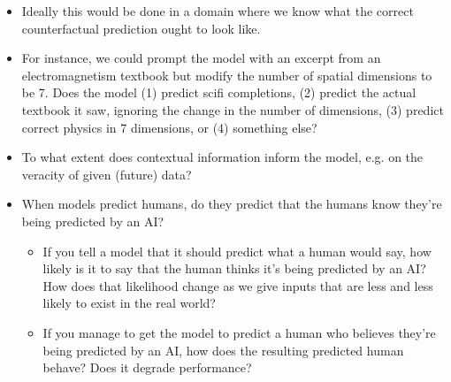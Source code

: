 {{\begin{itemize}
        \begin{itemize}
        \item Ideally this would be done in a domain where we know what the correct counterfactual prediction ought to look like.
        \item For instance, we could prompt the model with an excerpt from an electromagnetism textbook but modify the number of spatial dimensions to be 7. Does the model (1) predict scifi completions, (2) predict the actual textbook it saw, ignoring the change in the number of dimensions, (3) predict correct physics in 7 dimensions, or (4) something else?
        \end{itemize}
    \end{itemize}
\begin{itemize}
\item To what extent does contextual information inform the model, e.g. on the veracity of given (future) data?
\item When models predict humans, do they predict that the humans know they're being predicted by an AI?
    \begin{itemize}
    \item If you tell a model that it should predict what a human would say, how likely is it to say that the human thinks it's being predicted by an AI? How does that likelihood change as we give inputs that are less and less likely to exist in the real world?
    \item If you manage to get the model to predict a human who believes they're being predicted by an AI, how does the resulting predicted human behave? Does it degrade performance?

\end{itemize}
\end{itemize}}}
